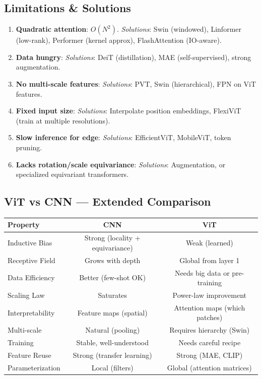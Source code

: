 \subsection{Limitations \& Solutions}
\begin{enumerate}
\item \textbf{Quadratic attention}: $O(N^2)$. \textit{Solutions}: Swin (windowed), Linformer (low-rank), Performer (kernel approx), FlashAttention (IO-aware).
\item \textbf{Data hungry}: \textit{Solutions}: DeiT (distillation), MAE (self-supervised), strong augmentation.
\item \textbf{No multi-scale features}: \textit{Solutions}: PVT, Swin (hierarchical), FPN on ViT features.
\item \textbf{Fixed input size}: \textit{Solutions}: Interpolate position embeddings, FlexiViT (train at multiple resolutions).
\item \textbf{Slow inference for edge}: \textit{Solutions}: EfficientViT, MobileViT, token pruning.
\item \textbf{Lacks rotation/scale equivariance}: \textit{Solutions}: Augmentation, or specialized equivariant transformers.
\end{enumerate}

\subsection{ViT vs CNN — Extended Comparison}
\begin{center}\small
\begin{tabular}{lcc}\toprule
\textbf{Property} & \textbf{CNN} & \textbf{ViT} \\\midrule
Inductive Bias & Strong (locality + equivariance) & Weak (learned) \\
Receptive Field & Grows with depth & Global from layer 1 \\
Data Efficiency & Better (few-shot OK) & Needs big data or pre-training \\
Scaling Law & Saturates & Power-law improvement \\
Interpretability & Feature maps (spatial) & Attention maps (which patches) \\
Multi-scale & Natural (pooling) & Requires hierarchy (Swin) \\
Training & Stable, well-understood & Needs careful recipe \\
Feature Reuse & Strong (transfer learning) & Strong (MAE, CLIP) \\
Parameterization & Local (filters) & Global (attention matrices) \\
\bottomrule
\end{tabular}
\end{center}

